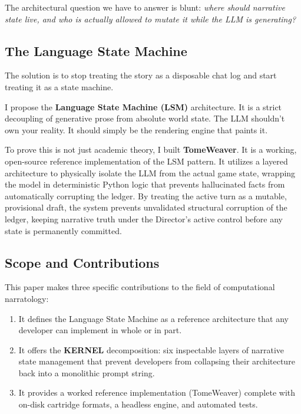 \documentclass[12pt, a4paper]{article}
\begin{document}
The architectural question we have to answer is blunt: \textit{where should narrative state live, and who is actually allowed to mutate it while the LLM is generating?}

\subsection{The Language State Machine}

The solution is to stop treating the story as a disposable chat log and start treating it as a state machine. 

I propose the \textbf{Language State Machine (LSM)} architecture. It is a strict decoupling of generative prose from absolute world state. The LLM shouldn't own your reality. It should simply be the rendering engine that paints it. 

To prove this is not just academic theory, I built \textbf{TomeWeaver}. It is a working, open-source reference implementation of the LSM pattern. It utilizes a layered architecture to physically isolate the LLM from the actual game state, wrapping the model in deterministic Python logic that prevents hallucinated facts from automatically corrupting the ledger. By treating the active turn as a mutable, provisional draft, the system prevents unvalidated structural corruption of the ledger, keeping narrative truth under the Director's active control before any state is permanently committed.

\subsection{Scope and Contributions}

This paper makes three specific contributions to the field of computational narratology:
\begin{enumerate}
    \item It defines the Language State Machine as a reference architecture that any developer can implement in whole or in part. 
    \item It offers the \textbf{KERNEL} decomposition: six inspectable layers of narrative state management that prevent developers from collapsing their architecture back into a monolithic prompt string.
    \item It provides a worked reference implementation (TomeWeaver) complete with on-disk cartridge formats, a headless engine, and automated tests.
\end{enumerate}
\end{document}
